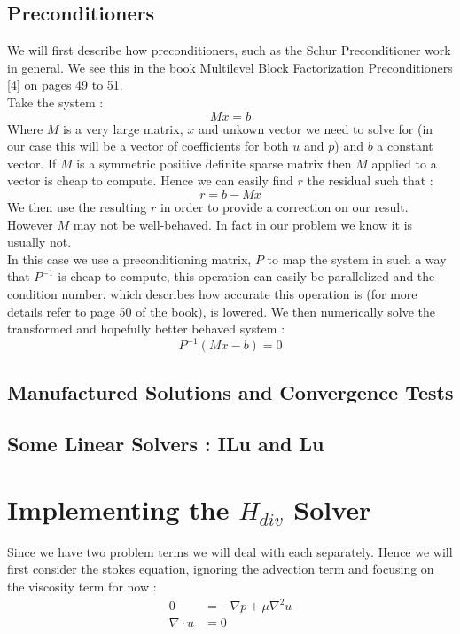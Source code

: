 \documentclass[11pt,twoside,a4paper]{article}
\begin{document}
\subsection{Preconditioners}

We will first describe how preconditioners, such as the Schur Preconditioner work in general. We see this in the book Multilevel Block Factorization Preconditioners [4] on pages 49 to 51.\\
Take the system :\\
$$
Mx = b
$$
Where $M$ is a very large matrix, $x$ and unkown vector we need to solve for (in our case this will be a vector of coefficients for both $u$ and $p$) and $b$ a constant vector. If $M$ is a symmetric positive definite sparse matrix then $M$ applied to a vector is cheap to compute. Hence we can easily find $r$ the residual such that :\\
$$
r = b - Mx
$$
We then use the resulting $r$ in order to provide a correction on our result.\\
However $M$ may not be well-behaved. In fact in our problem we know it is usually not.\\
In this case we use a preconditioning matrix, $P$ to map the system in such a way that $P^{-1}$ is cheap to compute, this operation can easily be parallelized and the condition number, which describes how accurate this operation is (for more details refer to page 50 of the book), is lowered.
We then numerically solve the transformed and hopefully better behaved system : 
$$
P^{-1}(Mx-b) = 0
$$ 

\subsection{Manufactured Solutions and Convergence Tests}

\subsection{Some Linear Solvers : ILu and Lu}
 


\section{Implementing the $H_{div}$ Solver}
Since we have two problem terms we will deal with each separately. Hence we will first consider the stokes equation, ignoring the advection term and focusing on the viscosity term for now :
\begin{align}
0 &= -\nabla p + \mu \nabla^2 u  \\
\nabla \cdot u &= 0
\end{align}
\end{document}
